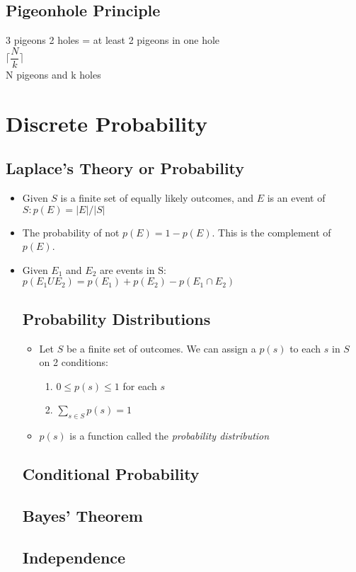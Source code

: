 \documentclass[a4paper]{article}
\begin{document}
\begin{multicols}{2}
	\subsection{Pigeonhole Principle}
	3 pigeons 2 holes = at least 2 pigeons in one hole\\
	$\lceil\dfrac{N}{k}\rceil$\\N pigeons and k holes

	\section{Discrete Probability}
	\subsection{Laplace's Theory or Probability}
	\begin{itemize}
		\item Given $S$ is a finite set of equally likely outcomes, and $E$ is an event of $S: p(E) = |E|/|S|$
		\item The probability of not $p(E) = 1 - p(E)$. This is the complement of $p(E)$.
		\item Given $E_1$ and $E_2$ are events in S: $p(E_1 U E_2) = p(E_1) + p(E_2) - p(E_1 \cap E_2)$
	\subsection{Probability Distributions}
	\begin{itemize}
		\item Let $S$ be a finite set of outcomes. We can assign a $p(s)$ to each $s$ in $S$ on 2 conditions:
		\begin{enumerate}
			\item $0 \leq p(s) \leq 1$ for each $s$
			\item $\sum_{s \in S}p(s) = 1$
		\end{enumerate}
		\item $p(s)$ is a function called the \textit{probability distribution}
	\end{itemize}
	\subsection{Conditional Probability}
	\subsection{Bayes' Theorem}
	\subsection{Independence}

\end{itemize}
\end{multicols}
\end{document}
